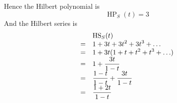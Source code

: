 \documentclass{article}
\begin{document}
\begin{enumerate}[style=nextline,label={Problem (\arabic*)}]
{\begin{enumerate}[label={(\alph*)}]
{Hence the Hilbert polynomial is
\[
\operatorname{HP}_S(t) = 3
\]
And the Hilbert series is
\[
\begin{array}{>{\displaystyle}c>{\displaystyle}l}
& \operatorname{HS}_S(t) \\
= & 1 + 3 t + 3 t^2 + 3 t^3 + \ldots \\
= & 1 + 3t(1 + t + t^2 + t^3 + \ldots) \\
= & 1 + \frac{3t}{1 - t} \\
= & \frac{1 - t}{1 - t} + \frac{3t}{1 - t} \\
= & \frac{1 + 2t}{1 - t} \\
\end{array}
\]
}
\end{enumerate}
}
\end{enumerate}
\end{document}
